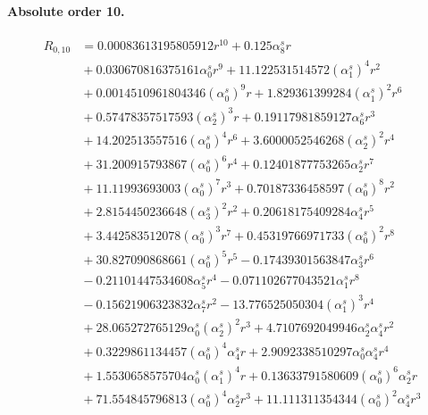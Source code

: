 \documentclass[10pt]{article}
\begin{document}
\paragraph{Absolute order 10.}
\begin{align*}
R_{0,10} &= 0.00083613195805912 r^{10} + 0.125 \alpha_{8}^s r \\
&{}  + 0.030670816375161 \alpha_{0}^s r^{9} + 11.122531514572 \left(\alpha_{1}^s\right)^{4} r^{2} \\
&{}  + 0.0014510961804346 \left(\alpha_{0}^s\right)^{9} r + 1.829361399284 \left(\alpha_{1}^s\right)^{2} r^{6} \\
&{}  + 0.57478357517593 \left(\alpha_{2}^s\right)^{3} r + 0.19117981859127 \alpha_{6}^s r^{3} \\
&{}  + 14.202513557516 \left(\alpha_{0}^s\right)^{4} r^{6} + 3.6000052546268 \left(\alpha_{2}^s\right)^{2} r^{4} \\
&{}  + 31.200915793867 \left(\alpha_{0}^s\right)^{6} r^{4} + 0.12401877753265 \alpha_{2}^s r^{7} \\
&{}  + 11.11993693003 \left(\alpha_{0}^s\right)^{7} r^{3} + 0.70187336458597 \left(\alpha_{0}^s\right)^{8} r^{2} \\
&{}  + 2.8154450236648 \left(\alpha_{3}^s\right)^{2} r^{2} + 0.20618175409284 \alpha_{4}^s r^{5} \\
&{}  + 3.442583512078 \left(\alpha_{0}^s\right)^{3} r^{7} + 0.45319766971733 \left(\alpha_{0}^s\right)^{2} r^{8} \\
&{}  + 30.827090868661 \left(\alpha_{0}^s\right)^{5} r^{5} - 0.17439301563847 \alpha_{3}^s r^{6} \\
&{}  - 0.21101447534608 \alpha_{5}^s r^{4} - 0.071102677043521 \alpha_{1}^s r^{8} \\
&{}  - 0.15621906323832 \alpha_{7}^s r^{2} - 13.776525050304 \left(\alpha_{1}^s\right)^{3} r^{4} \\
&{}  + 28.065272765129 \alpha_{0}^s \left(\alpha_{2}^s\right)^{2} r^{3} + 4.7107692049946 \alpha_{2}^s \alpha_{4}^s r^{2} \\
&{}  + 0.3229861134457 \left(\alpha_{0}^s\right)^{4} \alpha_{4}^s r + 2.9092338510297 \alpha_{0}^s \alpha_{4}^s r^{4} \\
&{}  + 1.5530658575704 \alpha_{0}^s \left(\alpha_{1}^s\right)^{4} r + 0.13633791580609 \left(\alpha_{0}^s\right)^{6} \alpha_{2}^s r \\
&{}  + 71.554845796813 \left(\alpha_{0}^s\right)^{4} \alpha_{2}^s r^{3} + 11.111311354344 \left(\alpha_{0}^s\right)^{2} \alpha_{4}^s r^{3} \\

\end{align*}
\end{document}
